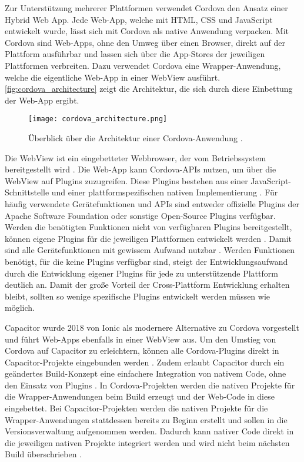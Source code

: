 Zur Unterstützung mehrerer Plattformen verwendet Cordova den Ansatz einer Hybrid Web App.
Jede Web-App, welche mit \ac{HTML}, \ac{CSS} und JavaScript entwickelt wurde, lässt sich mit Cordova als native Anwendung verpacken.
Mit Cordova sind Web-Apps, ohne den Umweg über einen Browser, direkt auf der Plattform ausführbar und lassen sich über die App-Stores der jeweiligen Plattformen verbreiten.
Dazu verwendet Cordova eine Wrapper-Anwendung, welche die eigentliche Web-App in einer WebView ausführt.
\autoref{fig:cordova_architecture} zeigt die Architektur, die sich durch diese Einbettung der Web-App ergibt.
\begin{figure}[h]
    \centering
    \texttt{[image: cordova\_architecture.png]}
    \caption{Überblick über die Architektur einer Cordova-Anwendung \cite{Cordova_Overview}.}
    \label{fig:cordova_architecture}
\end{figure}
Die WebView ist ein eingebetteter Webbrowser, der vom Betriebssystem bereitgestellt wird \cite{Steyer_Cordova}.
Die Web-App kann Cordova-\acp{API} nutzen, um über die WebView auf Plugins zuzugreifen.
Diese Plugins bestehen aus einer JavaScript-Schnittstelle und einer plattformspezifischen nativen Implementierung \cite{Steyer_Cordova,Heitkoetter_CrossPlatform_Comparison}.
Für häufig verwendete Gerätefunktionen und \acp{API} sind entweder offizielle Plugins der Apache Software Foundation oder sonstige Open-Source Plugins verfügbar.
Werden die benötigten Funktionen nicht von verfügbaren Plugins bereitgestellt, können eigene Plugins für die jeweiligen Plattformen entwickelt werden \cite{Cordova_Overview}.
Damit sind alle Gerätefunktionen mit gewissem Aufwand nutzbar \cite{Steyer_Cordova}.
Werden Funktionen benötigt, für die keine Plugins verfügbar sind, steigt der Entwicklungsaufwand durch die Entwicklung eigener Plugins für jede zu unterstützende Plattform deutlich an.
Damit der große Vorteil der Cross-Plattform Entwicklung erhalten bleibt, sollten so wenige spezifische Plugins entwickelt werden müssen wie möglich.

Capacitor wurde 2018 von Ionic als modernere Alternative zu Cordova vorgestellt und führt Web-Apps ebenfalls in einer WebView aus.
Um den Umstieg von Cordova auf Capacitor zu erleichtern, können alle Cordova-Plugins direkt in Capacitor-Projekte eingebunden werden \cite{Liebel_Cordova_Capacitor}.
Zudem erlaubt Capacitor durch ein geändertes Build-Konzept eine einfachere Integration von nativem Code, ohne den Einsatz von Plugins \cite{Ionic_Cordova_vs_Capacitor}.
In Cordova-Projekten werden die nativen Projekte für die Wrapper-Anwendungen beim Build erzeugt und der Web-Code in diese eingebettet.
Bei Capacitor-Projekten werden die nativen Projekte für die Wrapper-Anwendungen stattdessen bereits zu Beginn erstellt und sollen in die Versionsverwaltung aufgenommen werden.
Dadurch kann nativer Code direkt in die jeweiligen nativen Projekte integriert werden und wird nicht beim nächsten Build überschrieben \cite{Liebel_Cordova_Capacitor}.



